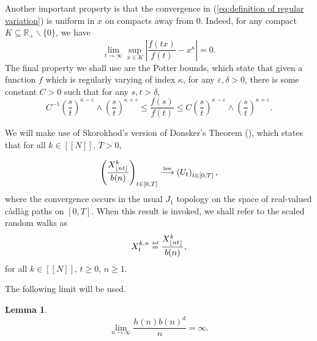 \documentclass[10pt,a4paper]{amsart}
\newcommand{\RR}{\mathbb R}
\newcommand{\1}{\mathds{1}}
\newcommand{\distribution}{\stackrel{\scaleto{\mathrm{law}}{4pt}}{\longrightarrow}}
\newcommand{\eqdef}{\stackrel{\scaleto{\mathrm{def}}{3.5pt}}{=}}
\newtheorem{lemma}{Lemma}
\numberwithin{equation}{section}
\begin{document}
Another important property is that the convergence in (\ref{eq:definition of regular variation}) is uniform in $x$ on compacts away from $0$. Indeed, for any compact $K\subseteq\RR_+\backslash\{0\}$, we have 
\begin{equation}
\label{limit:uniform convergence on compacts for regularly varying functions}
    \lim_{t\rightarrow\infty}\sup_{x\in K}\left|\frac{f(tx)}{f(t)}-x^\kappa\right|=0.
\end{equation}
The final property we shall use are the Potter bounds, which state that given a function $f$ which is regularly varying of index $\kappa$, for any $\varepsilon,\delta>0$, there is some constant $C>0$ such that for any $s,t>\delta$,
\begin{equation}
    \label{ineq:Potter bounds}
    C^{-1}\left(\frac{s}{t}\right)^{\kappa-\varepsilon}\wedge\left(\frac{s}{t}\right)^{\kappa+\varepsilon}\le\frac{f(s)}{f(t)}\le C\left(\frac{s}{t}\right)^{\kappa-\varepsilon}\wedge\left(\frac{s}{t}\right)^{\kappa+\varepsilon}.
\end{equation}

We will make use of Skorokhod's version of Donsker's Theorem (\cite{SkorokhodLimitTheoremsStochProc1956}), which states that for all $k\in[\![N]\!]$, $T>0$,

\begin{equation}
    \label{convergence:skorokhod's convergence theorem}
    \left(\frac{X_{\lfloor nt\rfloor}^k}{b(n)}\right)_{t\in[0,T]}\distribution\left(U_t\right)_{t\in[0,T]},
\end{equation}
where the convergence occurs in the usual $J_1$ topology on the space of real-valued càdlàg paths on $[0,T]$. When this result is invoked, we shall refer to the scaled random walks as
\begin{equation*}
    X_t^{k,n}\eqdef\frac{X_{\lfloor nt\rfloor}^k}{b(n)},
\end{equation*}
for all $k\in[\![N]\!]$, $t\ge0$, $n\ge1$.

The following limit will be used.
\begin{lemma}
\label{lemma:limit of h(n)b(n)^d/n}
    \begin{equation*}
        \underset{n\rightarrow\infty}\lim\frac{h(n)b(n)^d}{n}=\infty.
    \end{equation*}
\end{lemma}
\end{document}
